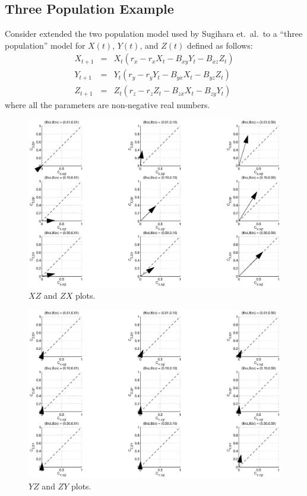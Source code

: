 \documentclass[a4paper,11pt]{article}
\begin{document}
\subsection{Three Population Example}
Consider extended the two population model used by Sugihara et.\ al.\ to a ``three population'' model for $X(t)$, $Y(t)$, and $Z(t)$ defined as follows:
\begin{eqnarray*}
X_{t+1} &=& X_t\left(r_x-r_x X_t-B_{xy} Y_t-B_{xz} Z_t\right)\\
Y_{t+1} &=& Y_t\left(r_y-r_y Y_t-B_{yx} X_t-B_{yz} Z_t\right)\\
Z_{t+1} &=& Z_t\left(r_z-r_z Z_t-B_{zx} X_t-B_{zy} Y_t\right)
\end{eqnarray*}
where all the parameters are non-negative real numbers.
\begin{figure}[h!t]
\centering
\label{fig:ThreePopFig1}
\includegraphics[scale=0.5]{graphics/ThreePopFig1.eps}
\caption{$XZ$ and $ZX$ plots.}
\end{figure}
\begin{figure}[h!t]
\centering
\label{fig:ThreePopFig2}
\includegraphics[scale=0.5]{graphics/ThreePopFig2.eps}
\caption{$YZ$ and $ZY$ plots.}
\end{figure}
\end{document}
